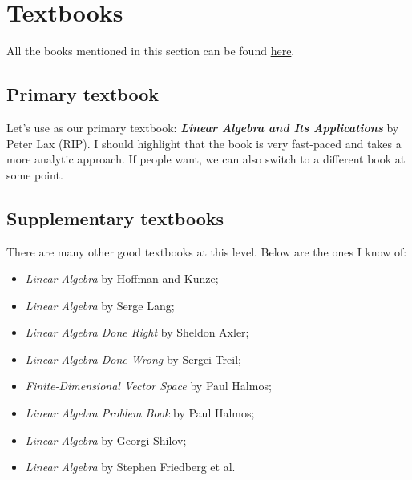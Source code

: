 \documentclass{article}
\begin{document}
\section{Textbooks}
All the books mentioned in this section can be found \href{https://github.com/shengweiming/Summer-Linear-Algebra/tree/main/textbooks}{here}.

\subsection{Primary textbook}
Let's use as our primary textbook: \textbf{\emph{Linear Algebra and Its Applications}} by Peter Lax (RIP). I should highlight that the book is very fast-paced and takes a more analytic approach. If people want, we can also switch to a different book at some point.

\subsection{Supplementary textbooks}
There are many other good textbooks at this level. Below are the ones I know of:
\begin{itemize}
    \item \textit{Linear Algebra} by Hoffman and Kunze;
    \item \textit{Linear Algebra} by Serge Lang;
    \item \textit{Linear Algebra Done Right} by Sheldon Axler;
    \item \textit{Linear Algebra Done Wrong} by Sergei Treil;
    \item \textit{Finite-Dimensional Vector Space} by Paul Halmos;
    \item \textit{Linear Algebra Problem Book} by Paul Halmos;
    \item \textit{Linear Algebra} by Georgi Shilov;
    \item \textit{Linear Algebra} by Stephen Friedberg et al.
\end{itemize}
\end{document}
